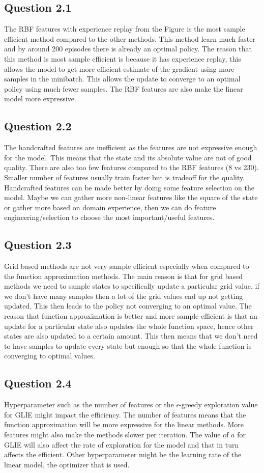\documentclass[a4paper]{article}
\begin{document}
\subsection*{Question 2.1}
The RBF features with experience replay from the Figure is the most sample efficient method compared to the other methods. This method learn much faster and by around 200 episodes there is already an optimal policy. The reason that this method is most sample efficient is because it has experience replay, this allows the model to get more efficient estimate of the gradient using more samples in the minibatch. This allows the update to converge to an optimal policy using much fewer samples. The RBF features are also make the linear model more expressive.  
\subsection*{Question 2.2}
The handcrafted features are inefficient as the features are not expressive enough for the model. This means that the state and its absolute value are not of good quality. There are also too few features compared to the RBF features (8 vs 230). Smaller number of features usually train faster but is tradeoff for the quality. Handcrafted features can be made better by doing some feature selection on the model. Maybe we can gather more non-linear features like the square of the state or gather more based on domain experience, then we can do feature engineering/selection to choose the most important/useful features.
\subsection*{Question 2.3}
Grid based methods are not very sample efficient especially when compared to the function approximation methods. The main reason is that for grid based methods we need to sample states to specifically update a particular grid value, if we don't have many samples then a lot of the grid values end up not getting updated. This then leads to the policy not converging to an optimal value. The reason that function approximation is better and more sample efficient is that an update for a particular state also updates the whole function space, hence other states are also updated to a certain amount. This then means that we don't need to have samples to update every state but enough so that the whole function is converging to optimal values.
\subsection*{Question 2.4}
Hyperparameter such as the number of features or the $\epsilon$-greedy exploration value for GLIE might impact the efficiency. The number of features means that the function approximation will be more expressive for the linear methods. More features might also make the methods slower per iteration. The value of $a$ for GLIE will also affect the rate of exploration for the model and that in turn affects the efficient. Other hyperparameter might be the learning rate of the linear model, the optimizer that is used.
\end{document}
